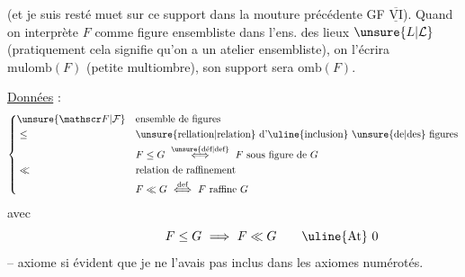 (et je suis resté muet sur ce support dans la mouture précédente GF $\underline{\overline{\mathrm{VI}}}$). Quand on interprète $F$ comme figure ensembliste dans l'ens. des lieux $\unsure{L|\mathcal L}$  (pratiquement cela signifie qu'on a un atelier ensembliste), on l'écrira $\mathrm{mulomb}(F)$ (petite multiombre), son support sera $\mathrm{omb}(F)$.

\uline{Données} \uline{ } :
\[
\left\{\begin{aligned}
&\unsure{\mathscr F|\mathcal F} &&\text{ensemble de figures}\\
&\leq &&\text{\unsure{rellation|relation} d'\uline{inclusion} \unsure{de|des} figures}\\
& &&F\leq G\ \overset{\text{\unsure{déf|def}}}{\Longleftrightarrow}\ F\ \text{sous figure de }G\\
&\ll &&\text{relation de raffinement}\\
& && F\ll G\ \overset{\text{def}}{\Longleftrightarrow}\ F\ \text{raffine }G
\end{aligned}\right.
\]
avec
\[
F\leq G\ \Longrightarrow\ F\ll G\tag*{\makebox[0pt][r]{\makebox[\displaywidth][l]{\uline{At} 0}}}
\]
-- axiome si évident que je ne l'avais pas inclus dans les axiomes numérotés.

